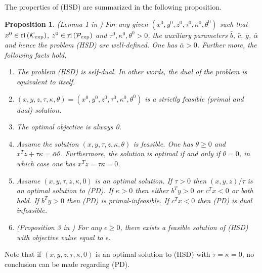 \documentclass[10pt]{article}
\theoremstyle{definition}
\theoremstyle{plain}
\newtheorem{prop}{Proposition}
\def\interior{\protect{\textnormal{ri}}}
\begin{document}
The properties of (HSD) are summarized in the following proposition.
\begin{prop}\label{properties_HSD} \textnormal{(Lemma 1 in \cite{Freund_behavior_HSD})}
	For any given $(x^0, y^0, z^0, \tau^0, \kappa^0, \theta^0)$ such that $x^0 \in \interior \left(\mathcal{K}_{\exp}\right)$, $z^0 \in \interior \left(\mathcal{P}_{\exp}\right)$ and $\tau^0, \kappa^0, \theta^0 > 0$, the auxiliary parameters $\bar{b}$, $\bar{c}$, $\bar{g}$, $\bar{\alpha}$ and hence the problem (HSD) are well-defined. One has $\bar{\alpha}>0$. Further more, the following facts hold.
	\begin{enumerate}
		\item The problem (HSD) is \textnormal{self-dual}. In other words, the dual of the problem is equivalent to itself. 
		\item $(x,y,z,\tau,\kappa, \theta) = (x^0,y^0,z^0, \tau^0,\kappa^0, \theta^0)$ is a strictly feasible (primal and dual) solution.
		\item The optimal objective is always 0. 
		\item Assume the solution $(x,y, \tau, z,\kappa, \theta)$ is feasible. One has $\theta\geq 0$ and $x^T z + \tau \kappa = \bar{\alpha} \theta$. Furthermore, the solution is optimal if and only if $\theta=0$, in which case one has $x^T z = \tau\kappa = 0$.
		\item Assume $(x,y, \tau, z,\kappa, 0)$ is an optimal solution. If $\tau>0$ then $(x,y,z)/\tau$ is an optimal solution to (PD). If $\kappa>0$ then either $b^Ty>0$ or $c^Tx<0$ or both hold. 
		\subitem If $b^T y>0$ then (PD) is primal-infeasible.
		\subitem If $c^T x < 0$ then (PD) is dual infeasible.
		\item \textnormal{(Proposition 3 in \cite{Freund_behavior_HSD})} For any $\epsilon \geq 0$, there exists a feasible solution of (HSD) with objective value equal to $\epsilon$.
	\end{enumerate}
\end{prop} 
Note that if $(x,y,z,\tau,\kappa,0)$ is an optimal solution to (HSD) with $\tau=\kappa=0$, no conclusion can be made regarding (PD). \\
\end{document}
